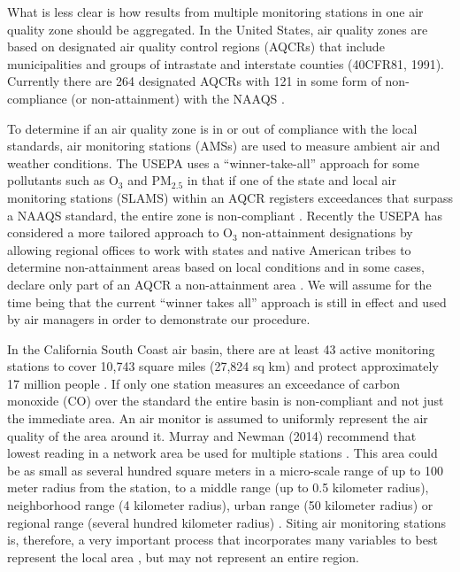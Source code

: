What is less clear is how results from multiple monitoring stations in one air quality zone should be aggregated. In the United States, air quality zones are based on designated air quality control regions (AQCRs) that include municipalities and groups of intrastate and interstate counties (40CFR81, 1991). Currently there are 264 designated AQCRs with 121 in some form of non-compliance (or non-attainment) with the NAAQS \citep{USEPA2016a}. 

To determine if an air quality zone is in or out of compliance with the local standards, air monitoring stations (AMSs) are used to measure ambient air and weather conditions. The USEPA uses a ``winner-take-all” approach for some pollutants such as O$_{3}$ and PM$_{2.5}$ in that if one of the state and local air monitoring stations (SLAMS) within an AQCR registers exceedances that surpass a NAAQS standard, the entire zone is non-compliant \citep{USEPA2005a}.  Recently the USEPA has considered a more tailored approach to O$_{3}$ non-attainment designations by allowing regional offices to work with states and native American tribes to determine non-attainment areas based on local conditions and in some cases, declare only part of an AQCR a non-attainment area \citep{McCabe2015}. We will assume for the time being that the current ``winner takes all” approach is still in effect and used by air managers in order to demonstrate our procedure.

In the California South Coast air basin, there are at least 43 active monitoring stations \citep{CARB2013} to cover 10,743 square miles (27,824 sq km) and protect approximately 17 million people \citep{AQMD2010}.  If only one station measures an exceedance of carbon monoxide (CO) over the standard the entire basin is non-compliant and not just the immediate area.  An air monitor is assumed to uniformly represent the air quality of the area around it.  Murray and Newman (2014) recommend that lowest reading in a network area be used for multiple stations \citep{Murray2014}. This area could be as small as several hundred square meters in a micro-scale range of up to 100 meter radius from the station, to a middle range (up to 0.5 kilometer radius), neighborhood range (4 kilometer radius), urban range (50 kilometer radius) or regional range (several hundred kilometer radius) \citep{Pan2009}.  Siting air monitoring stations is, therefore, a very important process that incorporates many variables to best represent the local area \citep{Bermudez2010}, but may not represent an entire region.

